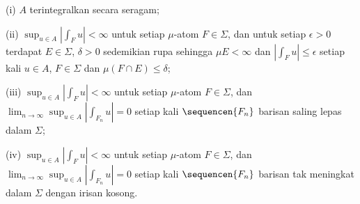 \quad(i) $A$ terintegralkan secara seragam;

\quad(ii) $\sup_{u\in A}|\int_Fu|<\infty$ untuk setiap $\mu$-atom
$F\in\Sigma$, dan untuk setiap $\epsilon>0$ terdapat $E\in\Sigma$, $\delta>0$
sedemikian rupa sehingga $\mu E<\infty$ dan $|\int_Fu|\le\epsilon$ setiap kali
$u\in A$, $F\in\Sigma$ dan $\mu(F\cap E)\le\delta$;

\quad(iii) $\sup_{u\in A}|\int_Fu|<\infty$ untuk setiap $\mu$-atom
$F\in\Sigma$, dan $\lim_{n\to\infty}\sup_{u\in A}|\int_{F_n}u|=0$ setiap kali
$\sequencen{F_n}$ barisan saling lepas dalam $\Sigma$;

\quad(iv) $\sup_{u\in A}|\int_Fu|<\infty$ untuk setiap $\mu$-atom
$F\in\Sigma$, dan $\lim_{n\to\infty}\sup_{u\in A}|\int_{F_n}u|=0$ setiap kali
$\sequencen{F_n}$ barisan tak meningkat dalam $\Sigma$ dengan irisan
kosong.


